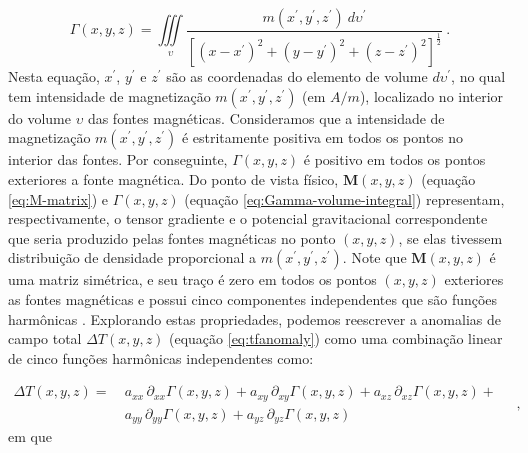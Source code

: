 \begin{equation}
\Gamma(x, y, z) = \iiint\limits_{\upsilon} 
\frac{m(x^{\prime}, y^{\prime}, z^{\prime}) \: d\upsilon^{\prime}}
{\left[ (x-x^{\prime})^2 + (y-y^{\prime})^2 + (z-z^{\prime})^2 \right]^{\frac{1}{2}}} \: .
\label{eq:Gamma-volume-integral}
\end{equation}
Nesta equação, $x^{\prime}$, $y^{\prime}$ e $z^{\prime}$ são as coordenadas do elemento de volume $d \upsilon^{\prime}$, no qual tem intensidade de magnetização $m(x^{\prime}, y^{\prime}, z^{\prime})$ (em $A/m$), localizado no interior do volume $\upsilon$ das fontes magnéticas. Consideramos que a intensidade de magnetização $m(x^{\prime}, y^{\prime}, z^{\prime})$ é estritamente positiva em todos os pontos no interior das fontes. Por conseguinte, $\Gamma(x, y, z)$ é positivo em todos os pontos exteriores a fonte magnética. Do ponto de vista físico, $\mathbf{M}(x, y, z)$ (equação \ref{eq:M-matrix}) e $\Gamma(x, y, z)$ (equação \ref{eq:Gamma-volume-integral}) representam, respectivamente, o tensor gradiente e o potencial gravitacional correspondente que seria produzido pelas fontes magnéticas no ponto $(x,y,z)$, se elas tivessem distribuição de densidade proporcional a $m(x^{\prime}, y^{\prime}, z^{\prime})$. Note que $\mathbf{M}(x, y, z)$ é uma matriz simétrica, e seu traço é zero em todos os pontos $(x,y,z)$ exteriores as fontes magnéticas e possui cinco componentes independentes que são funções harmônicas \citep{pedersen_rasmussen1990}. Explorando estas propriedades, podemos reescrever a anomalias de campo total $\Delta T(x, y, z)$ (equação \ref{eq:tfanomaly}) como uma combinação linear de cinco funções harmônicas independentes como:  

\begin{equation}
	\begin{split}
		\Delta T(x, y, z) = \:
		& a_{xx} \, \partial_{xx} \Gamma(x, y, z) + 
		a_{xy} \, \partial_{xy} \Gamma(x, y, z) + 
		a_{xz} \, \partial_{xz} \Gamma(x, y, z) + \\
		& a_{yy} \, \partial_{yy} \Gamma(x, y, z) + 
		a_{yz} \, \partial_{yz} \Gamma(x, y, z)
	\end{split} \quad ,
	\label{eq:tfanomaly-alternative}
\end{equation}
em que 

